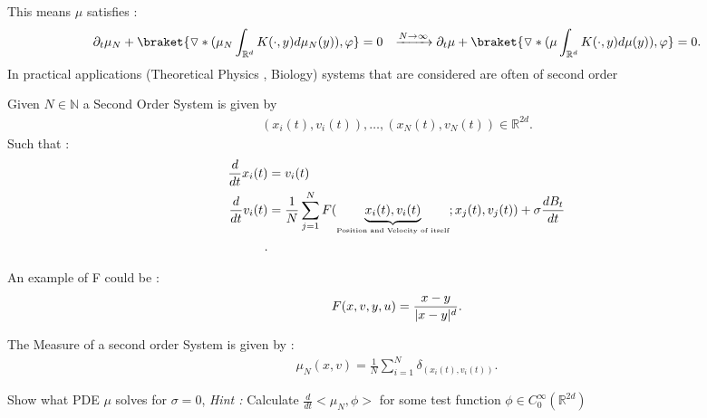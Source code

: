 This means $\mu $ satisfies : 
\begin{align*}
  &\partial_t \mu_N + \braket{\triangledown*(\mu_N \int_{\mathbb{R}^{d }} K(\cdot,y)d\mu_{N}(y)),\phi} = 0
  &\xrightarrow{N\to \infty} \partial_t \mu + \braket{\triangledown*(\mu \int_{\mathbb{R}^{d }} K(\cdot,y)d\mu(y)),\phi} = 0
.\end{align*}
In practical applications (Theoretical Physics , Biology) systems that are considered are often of second order
\begin{definition}
  Given $N \in  \mathbb{N} $ a Second Order System is given by 
  \begin{align*}
    (x_i(t),v_i(t)),\ldots ,(x_{N}(t),v_{N}(t)) \in  \mathbb{R}^{2d } 
  .\end{align*}
  Such that : 
  \begin{align*}
    \frac{d}{dt} x_i(t) &= v_i(t)  \\
    \frac{d}{dt} v_i(t) &= \frac{1}{N} \sum_{j=1}^{N} F(\underbrace{x_i(t),v_i(t)}_{\text{\tiny Position and Velocity of itself}} ; x_{j}(t),v_j(t))  + \sigma \frac{d B_t}{dt}\\ 
  .\end{align*}
\end{definition}
\begin{example}
  An example of F could be : 
  \begin{align*}
    F(x,v,y,u) = \frac{x-y}{\lvert x-y\rvert^{d} }
  .\end{align*}
\end{example}
\begin{definition}
 The Measure of a second order System is given by : 
 \begin{align*}
   \mu_{N}(x,v) = \frac{1}{N} \sum_{i=1}^{N} \delta_{(x_{i}(t),v_i(t))} 
 .\end{align*}
\end{definition}
\begin{exercise}
  Show what PDE $\mu $ solves for $\sigma = 0$, \textit{Hint :} Calculate  $\frac{d}{dt} <\mu_N,\phi> $ for some test function $\phi  \in C_{0}^{\infty}(\mathbb{R}^{2d} ) $
\end{exercise}
